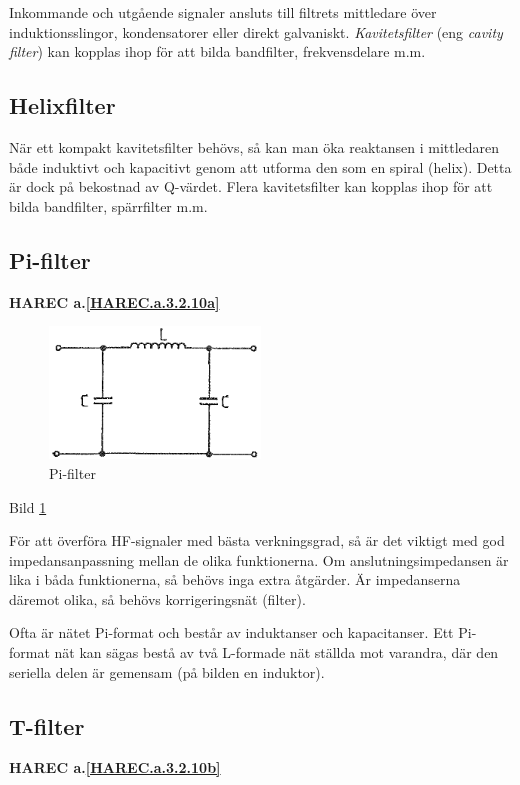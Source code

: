 Inkommande och utgående signaler ansluts till filtrets mittledare över
induktionsslingor, kondensatorer eller direkt galvaniskt. \emph{Kavitetsfilter} (eng
\emph{cavity filter}) kan kopplas ihop för att bilda bandfilter, frekvensdelare
m.m.

\subsection{Helixfilter}

När ett kompakt kavitetsfilter behövs, så kan man öka reaktansen i mittledaren
både induktivt och kapacitivt genom att utforma den som en spiral (helix).
Detta är dock på bekostnad av Q-värdet. Flera kavitetsfilter kan kopplas ihop
för att bilda bandfilter, spärrfilter m.m.

\subsection{Pi-filter}
\textbf{HAREC a.\ref{HAREC.a.3.2.10a}\label{myHAREC.a.3.2.10a}}

\begin{figure}
\includegraphics[width=0.5\textwidth]{images/bild_2_3-32.png}
\caption{Pi-filter}
\label{fig:BildII3-32}
\end{figure}

Bild \ref{fig:BildII3-32}

För att överföra HF-signaler med bästa verkningsgrad, så är det viktigt med god
impedansanpassning mellan de olika funktionerna. Om anslutningsimpedansen är
lika i båda funktionerna, så behövs inga extra åtgärder. Är impedanserna däremot
olika, så behövs korrigeringsnät (filter).

Ofta är nätet Pi-format och består av induktanser och kapacitanser. Ett
Pi-format nät kan sägas bestå av två L-formade nät ställda mot varandra, där
den seriella delen är gemensam (på bilden en induktor).

\subsection{T-filter}
\textbf{HAREC a.\ref{HAREC.a.3.2.10b}\label{myHAREC.a.3.2.10b}}

